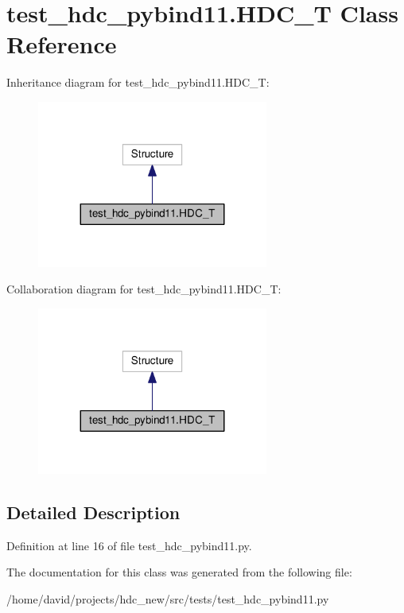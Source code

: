 \hypertarget{a00005}{}\section{test\+\_\+hdc\+\_\+pybind11.\+H\+D\+C\+\_\+T Class Reference}
\label{a00005}


Inheritance diagram for test\+\_\+hdc\+\_\+pybind11.\+H\+D\+C\+\_\+T\+:
\nopagebreak
\begin{figure}[H]
\begin{center}
\leavevmode
\includegraphics[width=215pt]{a00045}
\end{center}
\end{figure}


Collaboration diagram for test\+\_\+hdc\+\_\+pybind11.\+H\+D\+C\+\_\+T\+:
\nopagebreak
\begin{figure}[H]
\begin{center}
\leavevmode
\includegraphics[width=215pt]{a00046}
\end{center}
\end{figure}


\subsection{Detailed Description}


Definition at line 16 of file test\+\_\+hdc\+\_\+pybind11.\+py.



The documentation for this class was generated from the following file\+:\begin{DoxyCompactItemize}
\item 
/home/david/projects/hdc\+\_\+new/src/tests/test\+\_\+hdc\+\_\+pybind11.\+py\end{DoxyCompactItemize}

